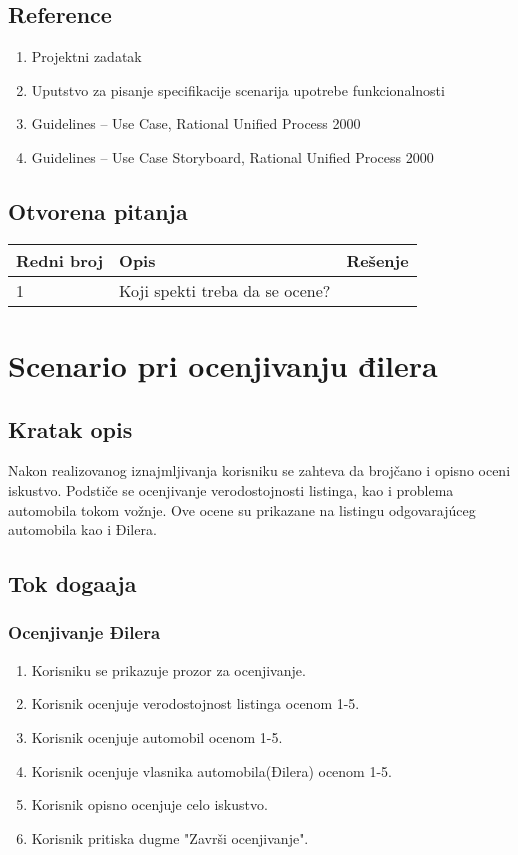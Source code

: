 \documentclass[12pt]{article}
\begin{document}
\subsection{Reference}
\begin{enumerate}
   \item Projektni zadatak
   \item Uputstvo za pisanje specifikacije scenarija upotrebe funkcionalnosti
   \item  Guidelines – Use Case, Rational Unified Process 2000
   \item  Guidelines – Use Case Storyboard, Rational Unified Process 2000
 \end{enumerate}
\subsection{Otvorena pitanja}


\begin{center}
\begin{tabular}{ | m{2cm} | m{7cm}| m{7cm} | } 
\hline
Redni broj& Opis & Rešenje \\ 
\hline
1 & Koji spekti treba da se ocene? & \\ 
\hline
\end{tabular}
\end{center}

    

\section{Scenario pri ocenjivanju đilera}
\subsection{Kratak opis}
Nakon realizovanog iznajmljivanja korisniku se zahteva da brojčano i opisno oceni
iskustvo. Podstiče se ocenjivanje verodostojnosti listinga, kao i problema automobila
tokom vožnje. Ove ocene su prikazane na listingu odgovarajúceg automobila kao i
Đilera.
\subsection{Tok doga\dj aja}

\subsubsection{Ocenjivanje Đilera}
\begin{enumerate}
  \item Korisniku se prikazuje prozor za ocenjivanje.
  \item Korisnik ocenjuje verodostojnost listinga ocenom 1-5.
  \item Korisnik ocenjuje automobil ocenom 1-5.
  \item Korisnik ocenjuje vlasnika automobila(Đilera) ocenom 1-5.
  \item Korisnik opisno ocenjuje celo iskustvo.
  \item Korisnik pritiska dugme "Završi ocenjivanje".
\end{enumerate}
\end{document}
